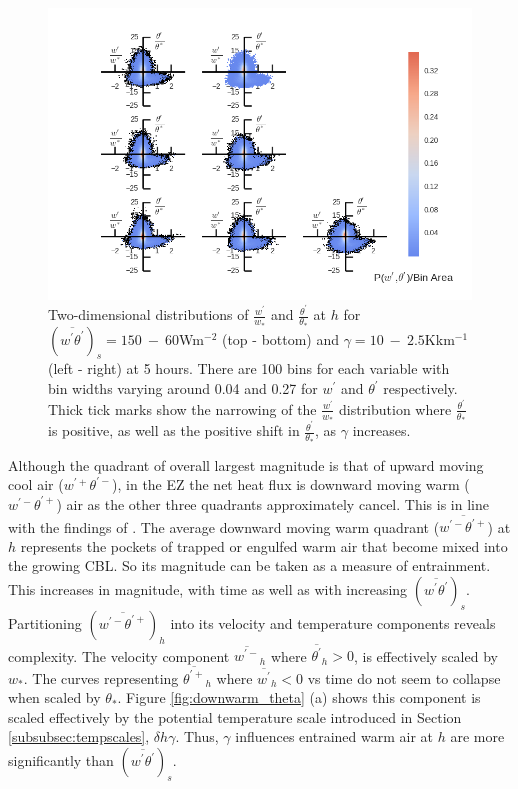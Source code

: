 \begin{figure}[htbp]
\centering
 \includegraphics[scale=.76]{figures/scaled_fluxquadhist1}                 
\caption[Two-dimensional Distributions of $\frac{w^{'}}{w_{*}}$ and $\frac{\theta^{'}}{\theta_{*}}$ for all Runs]{Two-dimensional distributions of $\frac{w^{'}}{w_{*}}$ and $\frac{\theta^{'}}{\theta_{*}}$ at $h$ for $(\overline{w^{'}\theta^{'}})_{s} = 150 \ - \ 60$Wm$^{-2}$ (top - bottom) and $\gamma = 10 \ - \  2.5$Kkm$^{-1}$ (left - right) at 5 hours. There are 100 bins for each variable with bin widths varying around 0.04 and 0.27 for $w^{'}$ and $\theta^{'}$ respectively. Thick tick marks show the narrowing of the $\frac{w^{'}}{w_{*}}$ distribution where $\frac{\theta^{'}}{\theta_{*}}$ is positive, as well as the positive shift in $\frac{\theta^{'}}{\theta_{*}}$, as $\gamma$ increases.}
\label{fig:scaled_fluxquadhs}
\end{figure}

Although the quadrant of overall largest magnitude is that of upward moving cool air ($w^{'+}\theta^{'-}$), in the EZ the net heat flux is downward moving warm ($w^{'-}\theta^{'+}$) air as the other three quadrants approximately cancel.  This is in line with the findings of \cite{SullMoengStev}.  The average downward moving warm quadrant ($\overline{w^{'-}\theta^{'+}}$) at $h$ represents the pockets of trapped or engulfed warm air that become mixed into the growing CBL.  So its magnitude can be taken as a measure of entrainment.  This increases in magnitude, with time as well as with increasing $(\overline{w^{'}\theta^{'}})_{s}$.  Partitioning $(\overline{w^{'-}\theta^{'+}})_{h}$ into its velocity and temperature components reveals complexity.  The velocity component $\overline{w^{'-}}_{h}$  where $ \overline{\theta^{'}}_{h}>0$, is effectively scaled by $w_{*}$.  The curves representing $\overline{\theta^{'+}}_{h}$ where $\overline{w^{'}}_{h}<0$ vs time do not seem to collapse when scaled by $\theta_{*}$.  Figure \ref{fig:downwarm_theta} (a) shows this component is scaled effectively by the potential temperature scale introduced in Section \ref{subsubsec:tempscales}, $\delta h \gamma$.  Thus, $\gamma$ influences entrained warm air at $h$ are more significantly than $(\overline{w^{'}\theta^{'}})_{s}$.\\ 
\\   

